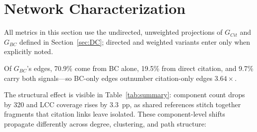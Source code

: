 \section{Network Characterization}\label{sec:NC}
All metrics in this section use the undirected, unweighted projections of $G_{Cit}$ and $G_{BC}$ defined in Section~\ref{sec:DC}; directed and weighted variants enter only when explicitly noted.

\begin{table}[t]
\centering
{}
\caption{Structural summary of $G_{Cit}$ and $G_{BC}$.
Neither graph contains isolated nodes by construction.
$C{=}0$: fraction of nodes with zero clustering; std.\ of $C$ is $0.284$ for both graphs;
$L$: mean geodesic (NetworKit, exact).}
\label{tab:summary}
\end{table}

Of $G_{BC}$'s edges, 70.9\% come from BC alone, 19.5\% from direct citation, and 9.7\% carry both signals---so BC-only edges outnumber citation-only edges $3.64\times$. 

The structural effect is visible in Table~\ref{tab:summary}: component count drops by 320 and LCC coverage rises by 3.3~pp, as shared references stitch together fragments that citation links leave isolated. These component-level shifts propagate differently across degree, clustering, and path structure:

